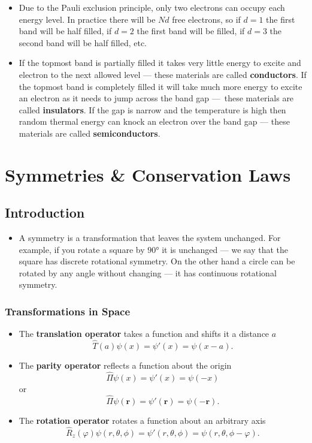 \documentclass{article}
\renewcommand{\vec}[1]{\boldsymbol{\mathbf{#1}}}
\begin{document}
\begin{itemize}
  \item Due to the Pauli exclusion principle, only two electrons can occupy each energy level. In practice there will be $N d$ free electrons, so if $d = 1$ the first band will be half filled, if $d = 2$ the first band will be filled, if $d = 3$ the second band will be half filled, etc.

  \item If the topmost band is partially filled it takes very little energy to excite and electron to the next allowed level — these materials are called \textbf{conductors}. If the topmost band is completely filled it will take much more energy to excite an electron as it needs to jump across the band gap — these materials are called \textbf{insulators}. If the gap is narrow and the temperature is high then random thermal energy can knock an electron over the band gap — these materials are called \textbf{semiconductors}.
\end{itemize}

\section{Symmetries \& Conservation Laws}

\subsection{Introduction}

\begin{itemize}
  \item A symmetry is a transformation that leaves the system unchanged. For example, if you rotate a square by $\ang{90}$ it is unchanged — we say that the square has discrete rotational symmetry. On the other hand a circle can be rotated by any angle without changing — it has continuous rotational symmetry.
\end{itemize}

\subsubsection{Transformations in Space}

\begin{itemize}
  \item The \textbf{translation operator} takes a function and shifts it a distance $a$ \[\hat{T}(a) \psi(x) = \psi'(x) = \psi(x - a).\]

  \item The \textbf{parity operator} reflects a function about the origin \[\hat{\Pi} \psi(x) = \psi'(x) = \psi(-x)\] or \[\hat{\Pi} \psi(\vec{r}) = \psi'(\vec{r}) = \psi(-\vec{r}).\]

  \item The \textbf{rotation operator} rotates a function about an arbitrary axis \[\hat{R}_z(\varphi) \psi(r, \theta, \phi) = \psi'(r, \theta, \phi) = \psi(r, \theta, \phi - \varphi).\]
\end{itemize}
\end{document}
